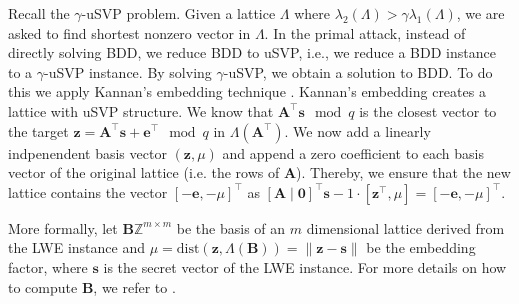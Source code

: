 Recall the $\gamma$-uSVP problem. Given a lattice $\Lambda$ where $\lambda_2(\Lambda) > \gamma \lambda_1(\Lambda)$, we are asked to find shortest nonzero vector in $\Lambda$.
In the primal attack, instead of directly solving BDD, we reduce BDD to uSVP, i.e., we reduce a BDD instance to a $\gamma$-uSVP instance. By solving $\gamma$-uSVP, we obtain a solution to BDD.
To do this we apply Kannan's embedding technique \cite{Kan87}. %
Kannan's embedding creates a lattice with uSVP structure. We know that $\mathbf{A}^\intercal \mathbf{s}\mod q$ is the closest vector to the target $\mathbf{z} =\mathbf{A}^\intercal \mathbf{s} + \mathbf{e}^\intercal \mod q$ in $\Lambda(\mathbf{A}^\intercal)$. We now add a linearly indpenendent basis vector  $(\mathbf{z}, \mu)$ and append a zero coefficient to each basis vector of the original lattice (i.e. the rows of $\mathbf{A}$). Thereby, we ensure that the new lattice contains the vector $[-\mathbf{e}, -\mu]^\intercal$ as $[\mathbf{A} \mid \mathbf{0}]^\intercal \mathbf{s} - 1 \cdot [\mathbf{z}^\intercal, \mu] = [-\mathbf{e}, -\mu]^\intercal$.

More formally, let $\mathbf{B} \mathbb{Z}^{m \times m}$ be the basis of an $m$ dimensional lattice derived from the LWE instance and $\mu = \text{dist}(\mathbf{z}, \Lambda(\mathbf{B})) = \| \mathbf{z} - \mathbf{s}\|$ be the embedding factor, where $\mathbf{s}$ is the secret vector of the LWE instance. For more details on how to compute $\mathbf{B}$, we refer to \cite{AFG13}. %

